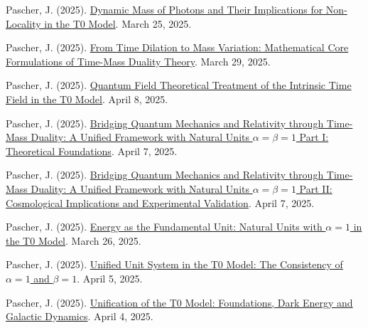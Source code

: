 \documentclass[12pt,a4paper]{article}
\begin{document}
\begin{thebibliography}{99}
		 Pascher, J. (2025). \href{https://github.com/jpascher/T0-Time-Mass-Duality/tree/main/2/pdf/English/DynMassePhotonenNichtlokalEn.pdf}{Dynamic Mass of Photons and Their Implications for Non-Locality in the T0 Model}. March 25, 2025.
		
		 Pascher, J. (2025). \href{https://github.com/jpascher/T0-Time-Mass-Duality/tree/main/2/pdf/English/MathZeitMasseLagrangeEn.pdf}{From Time Dilation to Mass Variation: Mathematical Core Formulations of Time-Mass Duality Theory}. March 29, 2025.
		
		 Pascher, J. (2025). \href{https://github.com/jpascher/T0-Time-Mass-Duality/tree/main/2/pdf/English/QFTIntrinsischesZeitT0En.pdf}{Quantum Field Theoretical Treatment of the Intrinsic Time Field in the T0 Model}. April 8, 2025.
		
		 Pascher, J. (2025). \href{https://github.com/jpascher/T0-Time-Mass-Duality/tree/main/2/pdf/English/QMRelTimeMassPart1ZEn.pdf}{Bridging Quantum Mechanics and Relativity through Time-Mass Duality: A Unified Framework with Natural Units $\alpha = \beta = 1$ Part I: Theoretical Foundations}. April 7, 2025.
		
		 Pascher, J. (2025). \href{https://github.com/jpascher/T0-Time-Mass-Duality/tree/main/2/pdf/English/QMRelTimeMassPart2ZEn.pdf}{Bridging Quantum Mechanics and Relativity through Time-Mass Duality: A Unified Framework with Natural Units $\alpha = \beta = 1$ Part II: Cosmological Implications and Experimental Validation}. April 7, 2025.
		
		 Pascher, J. (2025). \href{https://github.com/jpascher/T0-Time-Mass-Duality/tree/main/2/pdf/English/NatEinheitenAlpha1En.pdf}{Energy as the Fundamental Unit: Natural Units with $\alpha = 1$ in the T0 Model}. March 26, 2025.
		
		 Pascher, J. (2025). \href{https://github.com/jpascher/T0-Time-Mass-Duality/tree/main/2/pdf/English/Alpha1Beta1KonsistenzEn.pdf}{Unified Unit System in the T0 Model: The Consistency of $\alpha = 1$ and $\beta = 1$}. April 5, 2025.
		
		 Pascher, J. (2025). \href{https://github.com/jpascher/T0-Time-Mass-Duality/tree/main/2/pdf/English/T0VereinheitlichungDEGalEn.pdf}{Unification of the T0 Model: Foundations, Dark Energy and Galactic Dynamics}. April 4, 2025.
		

\end{thebibliography}
\end{document}
